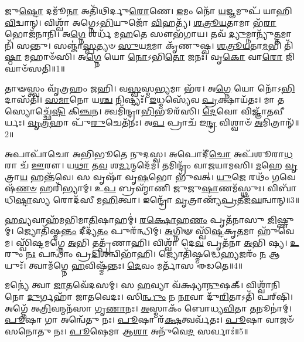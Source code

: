 \setcounter{anuvakam}{0}

𑌜𑍁\-\ul{𑌷𑍍𑌟𑍋} 𑌦𑌮𑍂᳴\-\ul{𑌨𑌾} 𑌅𑌤𑌿᳴𑌥𑌿𑌰𑍍𑌦𑍁\-\ul{𑌰𑍋}\-𑌣𑍇।
\-\ul{𑌇}\-𑌮𑌂 𑌨𑍋᳴ \ul{𑌯}\-𑌜𑍍𑌞𑌮𑍁𑌪᳴ 𑌯𑌾𑌹𑌿 \ul{𑌵𑌿}\-𑌦𑍍𑌵𑌾𑌨𑍍।
𑌵𑌿𑌶𑍍𑌵𑌾᳴ 𑌅𑌗𑍍𑌨𑍇\-𑌽\-\ul{𑌭𑌿}\-𑌯𑍁𑌜𑍋᳴ \ul{𑌵𑌿}\-𑌹𑌤𑍍𑌯᳴।
\-\ul{𑌶}\-\-\ul{𑌤𑍍𑌰𑍂}\-\-\ul{𑌯}\-𑌤𑌾𑌮𑌾 𑌭᳴\-\ul{𑌰𑌾} 𑌭𑍋𑌜᳴𑌨𑌾𑌨𑌿।
𑌅\-\ul{𑌗𑍍𑌨𑍇} 𑌶𑌰𑍍𑌧᳴ 𑌮\-\ul{𑌹}\-𑌤𑍇 𑌸𑍗𑌭᳴𑌗𑌾𑌯।
𑌤𑌵᳴ \ul{𑌦𑍍𑌯𑍁}\-𑌮𑍍𑌨𑌾𑌨𑍍𑌯𑍁᳴\-\ul{𑌤𑍍𑌤}\-𑌮𑌾𑌨𑌿᳴ 𑌸𑌨𑍍𑌤𑍁।
𑌸𑌞𑍍𑌜𑌾॑\-\ul{𑌸𑍍𑌪}\-𑌤𑍍𑌯𑍞 \ul{𑌸𑍁}\-𑌯\-\ul{𑌮}\-𑌮𑌾 𑌕𑍃᳴𑌣𑍁𑌷𑍍𑌵।
\-\ul{𑌶}\-\-\ul{𑌤𑍍𑌰𑍂}\-\-\ul{𑌯}\-𑌤𑌾\-\ul{𑌮}\-𑌭𑌿 𑌤𑌿᳴\-\ul{𑌷𑍍𑌠𑌾} 𑌮𑌹𑌾𑍞᳴𑌸𑌿।
𑌅\-\ul{𑌗𑍍𑌨𑍇} 𑌯𑍋 \ul{𑌨𑍋}\-\-𑌽𑌭𑌿\-\ul{𑌤𑍋} 𑌜𑌨𑌃᳴।
𑌵𑍃\-\ul{𑌕𑍋} 𑌵𑌾\-\ul{𑌰𑍋} 𑌜𑌿𑌘𑌾𑍞᳴𑌸𑌤𑌿॥1॥

𑌤𑌾𑍟𑌸𑍍𑌤𑍍𑌵𑌂 𑌵𑍃᳴𑌤𑍍𑌰𑌹𑌂 𑌜𑌹𑌿।
𑌵\-\ul{𑌸𑍍𑌵}\-𑌸𑍍𑌮\-\ul{𑌭𑍍𑌯}\-𑌮𑌾 𑌭᳴𑌰।
𑌅\-\ul{𑌗𑍍𑌨𑍇} 𑌯𑍋 𑌨𑍋᳴\-𑌽\-\ul{𑌭𑌿}\-𑌦𑌾𑌸᳴𑌤𑌿।
\-\ul{𑌸}\-\-\ul{𑌮𑌾}\-𑌨𑍋 𑌯\-\ul{𑌶𑍍𑌚} 𑌨𑌿𑌷𑍍𑌟𑍍𑌯𑌃᳴।
\-\ul{𑌇}\-𑌧𑍍𑌮𑌸𑍍𑌯𑍇᳴𑌵 \ul{𑌪𑍍𑌰}\-𑌕𑍍𑌷𑌾𑌯᳴𑌤𑌃।
𑌮𑌾 𑌤𑌸𑍍𑌯𑍋𑌚𑍍𑌛𑍇᳴\-\ul{𑌷𑌿} 𑌕𑌿\-\ul{𑌞𑍍𑌚}\-𑌨।
𑌤𑍍𑌵𑌮𑌿᳴𑌨𑍍𑌦𑍍𑌰𑌾\-\ul{𑌭𑌿}\-𑌭𑍂𑌰᳴𑌸𑌿।
\-\ul{𑌦𑍇}\-𑌵𑍋 𑌵𑌿𑌜𑍍𑌞𑌾᳴𑌤𑌵𑍀𑌰𑍍𑌯𑌃।
\-\ul{𑌵𑍃}\-\-\ul{𑌤𑍍𑌰}\-𑌹𑌾 𑌪𑍁᳴\-\ul{𑌰𑍁}\-𑌚𑍇𑌤᳴𑌨𑌃।
𑌅\-\ul{𑌪} 𑌪𑍍𑌰𑌾𑌚᳴ 𑌇\-\ul{𑌨𑍍𑌦𑍍𑌰} 𑌵𑌿𑌶𑍍𑌵𑌾𑍞᳴ \ul{𑌅}\-𑌮𑌿𑌤𑍍𑌰𑌾𑌨𑍍᳴॥2॥

𑌅𑌪𑌾𑌪𑌾᳴𑌚𑍋 𑌅𑌭𑌿𑌭𑍂𑌤𑍇 𑌨𑍁𑌦𑌸𑍍𑌵।
𑌅𑌪𑍋𑌦𑍀᳴\-\ul{𑌚𑍋} 𑌅𑌪᳴𑌶𑍂𑌰𑌾\-\ul{𑌧}\-𑌰𑌾 𑌚᳴ \ul{𑌊}\-𑌰𑍗।
𑌯\-\ul{𑌥𑌾} 𑌤\-\ul{𑌵} 𑌶\-\ul{𑌰𑍍𑌮}\-𑌨𑍍𑌮𑌦𑍇᳴𑌮।
𑌤𑌮𑌿𑌨𑍍𑌦𑍍𑌰𑌂᳴ 𑌵𑌾𑌜𑌯𑌾𑌮𑌸𑌿।
\-\ul{𑌮}\-𑌹𑍇 \ul{𑌵𑍃}\-𑌤𑍍𑌰𑌾\-\ul{𑌯} 𑌹𑌨𑍍𑌤᳴𑌵𑍇।
𑌸 𑌵𑍃𑌷𑌾᳴ 𑌵𑍃\-\ul{𑌷}\-𑌭𑍋 𑌭𑍁᳴𑌵𑌤𑍍।
\-\ul{𑌯𑍁}\-𑌜𑍇 𑌰𑌥𑌂᳴ \ul{𑌗}\-𑌵𑍇𑌷᳴\-\ul{𑌣}\-\-\ul{𑍞} 𑌹𑌰𑌿᳴𑌭𑍍𑌯𑌾𑌮𑍍।
𑌉\-\ul{𑌪} 𑌬𑍍𑌰𑌹𑍍𑌮𑌾᳴𑌣𑌿 𑌜𑍁𑌜𑍁\-\ul{𑌷𑌾}\-𑌣𑌮᳴𑌸𑍍𑌥𑍁𑌃।
𑌵𑌿𑌬𑌾᳴𑌧𑌿\-\ul{𑌷𑍍𑌟𑌾}\-𑌸𑍍𑌯 𑌰𑍋𑌦᳴𑌸𑍀 𑌮\-\ul{𑌹𑌿}\-𑌤𑍍𑌵𑌾।
𑌇𑌨𑍍𑌦𑍍𑌰𑍋᳴ \ul{𑌵𑍃}\-𑌤𑍍𑌰𑌾𑌣𑍍𑌯᳴\-\ul{𑌪𑍍𑌰}\-𑌤𑍀𑌜᳴\-\ul{𑌘}\-𑌨𑍍𑌵𑌾𑌨𑍍॥3॥

\-\ul{𑌹}\-\-\ul{𑌵𑍍𑌯}\-𑌵𑌾𑌹᳴𑌮𑌭𑌿𑌮𑌾\-\ul{𑌤𑌿}\-𑌷𑌾𑌹𑌮𑍍॑।
\-\ul{𑌰}\-\-\ul{𑌕𑍍𑌷𑍋}\-𑌹\-\ul{𑌣𑌂} 𑌪𑍃𑌤᳴𑌨𑌾𑌸𑍁 \ul{𑌜𑌿}\-𑌷𑍍𑌣𑍁𑌮𑍍।
𑌜𑍍𑌯𑍋𑌤𑌿᳴𑌷𑍍𑌮\-\ul{𑌨𑍍𑌤𑌂} 𑌦𑍀𑌦𑍍𑌯᳴\-\ul{𑌤𑌂} 𑌪𑍁𑌰᳴𑌨𑍍𑌧𑌿𑌮𑍍।
\-\ul{𑌅}\-𑌗𑍍𑌨𑌿𑍟 𑌸𑍍𑌵𑌿᳴\-\ul{𑌷𑍍𑌟}\-𑌕𑍃\-\ul{𑌤}\-𑌮𑌾 𑌹𑍁᳴𑌵𑍇𑌮।
𑌸𑍍𑌵𑌿᳴𑌷𑍍𑌟𑌮𑌗𑍍𑌨𑍇 \ul{𑌅}\-𑌭𑌿 𑌤𑌤𑍍𑌪𑍃᳴𑌣𑌾𑌹𑌿।
𑌵𑌿𑌶𑍍𑌵𑌾᳴ 𑌦𑍇\-\ul{𑌵} 𑌪𑍃𑌤᳴𑌨𑌾 \ul{𑌅}\-𑌭𑌿 𑌷𑍍𑌯।
\-\ul{𑌉}\-𑌰𑍁𑌂 \ul{𑌨𑌃} 𑌪𑌨𑍍𑌥𑌾𑌂॑ 𑌪𑍍𑌰\-\ul{𑌦𑌿}\-𑌶𑌨𑍍𑌵𑌿𑌭𑌾᳴𑌹𑌿।
𑌜𑍍𑌯𑍋𑌤𑌿᳴𑌷𑍍𑌮𑌦𑍍𑌧𑍇\-\ul{𑌹𑍍𑌯}\-𑌜𑌰𑌂᳴ \ul{𑌨} 𑌆𑌯𑍁𑌃᳴।
𑌤𑍍𑌵𑌾𑌮᳴𑌗𑍍𑌨𑍇 \ul{𑌹}\-𑌵𑌿𑌷𑍍𑌮᳴𑌨𑍍𑌤𑌃।
\-\ul{𑌦𑍇}\-𑌵𑌂 𑌮𑌰𑍍𑌤𑌾᳴𑌸 𑌈𑌡𑌤𑍇॥4॥

𑌮𑌨𑍍𑌯𑍇॑ 𑌤𑍍𑌵𑌾 \ul{𑌜𑌾}\-𑌤𑌵𑍇᳴𑌦𑌸𑌮𑍍।
𑌸 \ul{𑌹}\-𑌵𑍍𑌯𑌾 𑌵᳴𑌕𑍍𑌷𑍍𑌯𑌾\-\ul{𑌨𑍁}\-𑌷𑌕𑍍।
𑌵𑌿𑌶𑍍𑌵𑌾᳴𑌨𑌿 𑌨𑍋 \ul{𑌦𑍁}\-𑌰𑍍𑌗𑌹𑌾᳴ 𑌜𑌾𑌤𑌵𑍇𑌦𑌃।
𑌸𑌿\-\ul{𑌨𑍍𑌧𑍁𑌂} 𑌨 \ul{𑌨𑌾}\-𑌵𑌾 𑌦𑍁᳴\-\ul{𑌰𑌿}\-𑌤𑌾𑌽𑌤𑌿᳴ 𑌪𑌰𑍍‌\mbox{}𑌷𑌿।
𑌅𑌗𑍍𑌨𑍇᳴ 𑌅\-\ul{𑌤𑍍𑌰𑌿}\-𑌵𑌨𑍍𑌮𑌨᳴𑌸𑌾 𑌗𑍃\-\ul{𑌣𑌾}\-𑌨𑌃।
\-\ul{𑌅}\-𑌸𑍍𑌮𑌾𑌕𑌂᳴ 𑌬𑍋𑌧𑍍𑌯\-\ul{𑌵𑌿}\-𑌤𑌾 \ul{𑌤}\-𑌨𑍂𑌨𑌾॑𑌮𑍍।
\-\ul{𑌪𑍂}\-𑌷𑌾 𑌗𑌾 𑌅𑌨𑍍𑌵𑍇᳴𑌤𑍁 𑌨𑌃।
\-\ul{𑌪𑍂}\-𑌷𑌾 𑌰᳴\-\ul{𑌕𑍍𑌷}\-𑌤𑍍𑌵𑌰𑍍𑌵᳴𑌤𑌃।
\-\ul{𑌪𑍂}\-𑌷𑌾 𑌵𑌾𑌜𑍞᳴ 𑌸𑌨𑍋𑌤𑍁 𑌨𑌃।
\-\ul{𑌪𑍂}\-𑌷𑍇𑌮𑌾 𑌆\-\ul{𑌶𑌾} 𑌅𑌨𑍁᳴𑌵𑍇\-\ul{𑌦} 𑌸𑌰𑍍𑌵𑌾𑌃॑॥5॥

